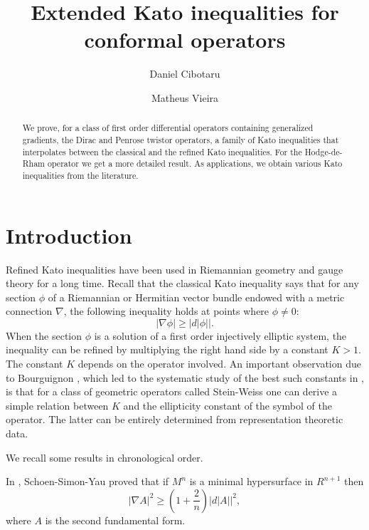 \documentclass[12pt]{amsart} %
\theoremstyle{definition}
\numberwithin{equation}{section}
\begin{document}
\title{Extended Kato inequalities for conformal operators}

\vspace{0.5cm}

\author{Daniel Cibotaru}
\author{Matheus Vieira}



\begin{abstract} We prove, for a class of first order differential operators containing generalized gradients, the  Dirac and Penrose twistor operators, a family of Kato inequalities that interpolates between the classical and the refined Kato inequalities. For the Hodge-de-Rham operator we get a more detailed result. As applications, we obtain various Kato inequalities from the literature.
\end{abstract}

\pagestyle{empty}
\maketitle
\tableofcontents
\section{Introduction}

Refined Kato inequalities have been used in Riemannian geometry and gauge theory for a long time. Recall that the classical Kato inequality says that for any section $\phi$ of a Riemannian or Hermitian vector bundle endowed with a metric connection $\nabla$, the following inequality holds at points where $\phi\neq 0$:
\[|\nabla \phi|\geq |d|\phi||.\]
When the section $\phi$ is a solution of a first order injectively elliptic system, the inequality can be refined by multiplying the right hand side by a constant $K>1$. The constant $K$ depends on the operator involved. An important observation due to Bourguignon \cite{Bo}, which led to the systematic study of the best such constants in \cite{B2000,CGH2000}, is that for a class of geometric operators called Stein-Weiss one can derive a simple relation between $K$ and the ellipticity constant of the symbol of the operator. The latter can be entirely determined from representation theoretic data.

We recall some results in chronological order.

In \cite{SSY1975}, Schoen-Simon-Yau proved that if $M^{n}$ is a
minimal hypersurface in $R^{n+1}$ then
\[
\left|\nabla A\right|^{2}\geq\left(1+\frac{2}{n}\right)\left|d\left|A\right|\right|^{2},
\]
where $A$ is the second fundamental form.
\end{document}
